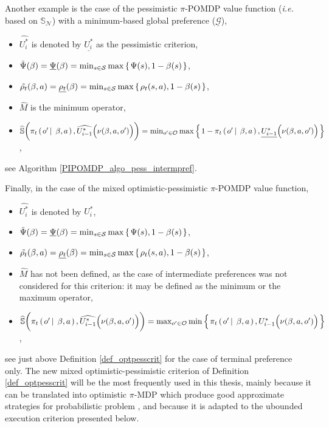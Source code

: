 Another example is the case of the pessimistic $\pi$-POMDP value function 
(\textit{i.e.} based on $\mathbb{S}_{\mathcal{N}}$) 
with a minimum-based global preference ($\underline{\mathcal{G}}$),
\begin{itemize}
\item $\widehat{U^*_{i}}$ is denoted by $\underline{U^*_i}$ as the pessimistic criterion,
\item $\tilde{\Psi}(\beta) = \underline{\Psi}(\beta) = \min_{s \in \mathcal{S}} \max \left\{ \left.  \Psi(s), 1 - \beta(s)   \right. \right\}$,
\item $\tilde{\rho_t}(\beta,a) = \underline{\rho_t}(\beta) = \min_{s \in \mathcal{S}} \max \left\{ \left.  \rho_t(s,a), 1 - \beta(s)   \right. \right\}$,
\item $\widehat{M}$ is the minimum operator,
\item $\widehat{\mathbb{S}}\bigg( \pi_t \left( \left. o' \, \right| \left. \, \beta, a \right. \right), \widehat{U^*_{i-1}} \Big( \nu( \beta,a,o') \Big) \bigg)   = \min_{o' \in \mathcal{O}} \max \left\{ \left.  1 - \pi_t \left( \left.  o' \, \right| \left. \, \beta,a  \right. \right), \underline{U^*_{i-1}}\Big( \nu( \beta,a,o') \Big)   \right. \right\}$,
\end{itemize}
see Algorithm \ref{PIPOMDP_algo_pess_intermpref}.

Finally, in the case of the mixed optimistic-pessimistic $\pi$-POMDP value function,
\begin{itemize}
\item $\widehat{U^*_{i}}$ is denoted by $U^*_i$,
\item $\tilde{\Psi}(\beta) = \underline{\Psi}(\beta) = \min_{s \in \mathcal{S}} \max \left\{ \left.  \Psi(s), 1 - \beta(s)   \right. \right\}$,
\item $\tilde{\rho_t}(\beta,a) = \underline{\rho_t}(\beta) = \min_{s \in \mathcal{S}} \max \left\{ \left.  \rho_t(s,a), 1 - \beta(s)   \right. \right\}$,
\item $\widehat{M}$ has not been defined, as the case of intermediate preferences was not considered for this criterion: 
it may be defined as the minimum or the maximum operator,
\item $\widehat{\mathbb{S}}\bigg( \pi_t \left( \left. o' \, \right| \left. \, \beta, a \right. \right), \widehat{U^*_{i-1}} \Big( \nu( \beta,a,o') \Big) \bigg)  = \max_{o' \in \mathcal{O}} \min \left\{ \left. \pi_t \left( \left.  o' \, \right| \left. \, \beta,a  \right. \right), U^*_{i-1}\Big( \nu( \beta,a,o') \Big)   \right. \right\}$,
\end{itemize}
see just above Definition \ref{def_optpesscrit} for the case of terminal preference only.
The new mixed optimistic-pessimistic criterion of Definition \ref{def_optpesscrit} 
will be the most frequently used in this thesis,
mainly because it can be translated into 
optimistic $\pi$-MDP which produce good approximate strategies 
for probabilistic problem \cite{conf/ecai/Sabbadi00}, 
and because it is adapted to the ubounded execution criterion presented below.

